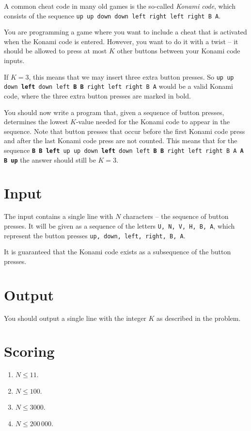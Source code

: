 
A common cheat code in many old games is the so-called \emph{Konami code}, which consists of the sequence \texttt{up up down down left right left right B A}.

You are programming a game where you want to include a cheat that is activated when the Konami code is entered. However, you want to do it with a twist -- it should be allowed to press at most $K$ other buttons between your Konami code inputs.

If $K = 3$, this means that we may insert three extra button presses. So \texttt{up up down \textbf{left} down left \textbf{B B} right left right B A} would be a valid Konami code, where the three extra button presses are marked in bold.

You should now write a program that, given a sequence of button presses, determines the lowest $K$-value needed for the Konami code to appear in the sequence. Note that button presses that occur before the first Konami code press and after the last Konami code press are not counted. This means that for the sequence \texttt{\textbf{B B left} up up down \textbf{left} down left \textbf{B B} right left right B A \textbf{A B up}} the answer should still be $K = 3$.

\section*{Input}
The input contains a single line with $N$ characters -- the sequence of button presses. It will be given as a sequence of the letters \texttt{U, N, V, H, B, A}, which represent the button presses \texttt{up, down, left, right, B, A}.

It is guaranteed that the Konami code exists as a subsequence of the button presses.

\section*{Output}
You should output a single line with the integer $K$ as described in the problem.

\section*{Scoring}

\begin{enumerate}
	\item[7 points] $N \le 11$.
	\item[11 points] $N \le 100$.
	\item[12 points] $N \le 3000$.
	\item[20 points] $N \le 200\,000$.
\end{enumerate}
